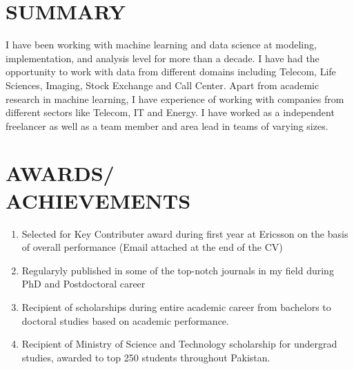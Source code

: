 \documentclass[margin, 10pt]{res} %
\begin{document}
\begin{resume}

 
\section{SUMMARY}
I have been working with machine learning and data science at modeling, implementation, and analysis level for more than a decade. 
I have had the opportunity to work with data from different domains including Telecom, Life Sciences, Imaging, Stock Exchange and Call Center.
Apart from academic research in machine learning, I have experience of working with companies from different sectors like Telecom, IT and Energy.
I have worked as a independent freelancer as well as a team member and area lead in teams of varying sizes.



\section{AWARDS/ \\ ACHIEVEMENTS} 

\begin{enumerate}
    \item Selected for Key Contributer award during first year at Ericsson on the basis of overall performance (Email attached at the end of the CV)
    \item Regularyly published in some of the top-notch journals in my field during PhD and Postdoctoral career
    \item Recipient of scholarships during entire academic career from bachelors to doctoral studies based on academic performance.
    \item Recipient of Ministry of Science and Technology scholarship for undergrad studies, awarded to top 250 students throughout Pakistan.
    \end{enumerate} 



\end{resume}
\end{document}
